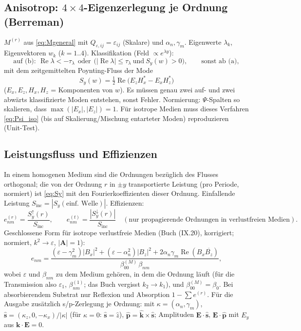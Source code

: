 \subsection{Anisotrop: $4\times4$-Eigenzerlegung je Ordnung (Berreman)}
$M^{(r)}$ aus \eqref{eq:Mgeneral} mit $Q_{\varepsilon,ij}=\varepsilon_{ij}$ (Skalare) und $\alpha_n,\gamma_m$.
Eigenwerte $\lambda_k$, Eigenvektoren $w_k$ ($k=1..4$). Klassifikation (Feld $\propto e^{\lambda y}$):
\begin{equation}
  \text{auf (b)}:\ \operatorname{Re}\lambda<-\tau_\lambda\ \ \text{oder}\ \ \big(|\operatorname{Re}\lambda|\le\tau_\lambda\ \text{und}\ S_y(w)>0\big),
  \qquad\text{sonst ab (a)},
  \label{eq:classify}
\end{equation}
mit dem zeitgemittelten Poynting-Fluss der Mode
\begin{equation}
  S_y(w)=\tfrac12\operatorname{Re}\big(E_zH_x^*-E_xH_z^*\big)
  \label{eq:Sy}
\end{equation}
($E_x,E_z,H_x,H_z$ = Komponenten von $w$). Es müssen genau zwei auf- und zwei abwärts
klassifizierte Moden entstehen, sonst Fehler. Normierung: $\Psi$-Spalten so skalieren, dass
$\max(|E_x|,|E_z|)=1$. Für isotrope Medien muss dieses Verfahren \eqref{eq:Psi_iso} (bis auf
Skalierung/Mischung entarteter Moden) reproduzieren (Unit-Test).

\subsection{Leistungsfluss und Effizienzen}
In einem homogenen Medium sind die Ordnungen bezüglich des Flusses orthogonal; die von der Ordnung
$r$ in $\pm y$ transportierte Leistung (pro Periode, normiert) ist \eqref{eq:Sy} mit den Fourierkoeffizienten
dieser Ordnung. Einfallende Leistung $S_{\text{inc}}=|S_y(\text{einf.\ Welle})|$. Effizienzen:
\begin{equation}
  e^{(r)}_{nm}=\frac{S_y^{\uparrow}(r)}{S_{\text{inc}}},\qquad e^{(t)}_{nm}=\frac{|S_y^{\downarrow}(r)|}{S_{\text{inc}}}
  \quad(\text{nur propagierende Ordnungen in verlustfreien Medien}).
  \label{eq:eff}
\end{equation}
Geschlossene Form für isotrope verlustfreie Medien (Buch (IX.20), korrigiert; normiert,
$k^2\to\varepsilon$, $|\mathbf A|=1$):
\begin{equation}
  e_{nm}=\frac{(\varepsilon-\gamma_m^2)|B_x|^2+(\varepsilon-\alpha_n^2)|B_z|^2+2\alpha_n\gamma_m\operatorname{Re}(B_x\overline{B_z})}
  {\beta_{00}^{(M)}\,\beta_{nm}},
  \label{eq:eff_closed}
\end{equation}
wobei $\varepsilon$ und $\beta_{nm}$ zu dem Medium gehören, in dem die Ordnung läuft (für die
Transmission also $\varepsilon_1$, $\beta^{(1)}_{nm}$; das Buch vergisst $k_2\to k_1$), und
$\beta^{(M)}_{00}=\beta_0$. Bei absorbierendem Substrat nur Reflexion und Absorption $1-\sum e^{(r)}$.
Für die Ausgabe zusätzlich s/p-Zerlegung je Ordnung: mit $\kappa=(\alpha_n,\gamma_m)$,
$\hat{\mathbf s}=(\kappa_z,0,-\kappa_x)/|\kappa|$ (für $\kappa=0$: $\hat{\mathbf s}=\hat z$),
$\hat{\mathbf p}=\hat{\mathbf k}\times\hat{\mathbf s}$; Amplituden $\mathbf E\cdot\hat{\mathbf s}$, $\mathbf E\cdot\hat{\mathbf p}$
mit $E_y$ aus $\mathbf k\cdot\mathbf E=0$.

